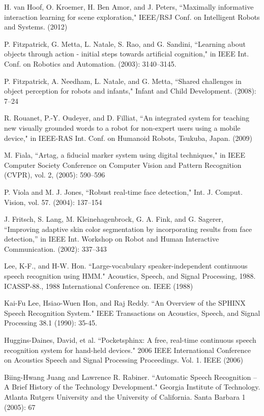\documentclass[conference]{IEEEtran}
\begin{document}
\begin{thebibliography}{1}
 H. van Hoof, O. Kroemer, H. Ben Amor, and J. Peters, ``Maximally informative interaction learning for scene exploration," IEEE/RSJ Conf. on Intelligent Robots and Systems. (2012)


 P. Fitzpatrick, G. Metta, L. Natale, S. Rao, and G. Sandini, ``Learning
about objects through action - initial steps towards artificial cognition," in IEEE Int. Conf. on Robotics and Automation. (2003): 3140–3145.

 P. Fitzpatrick, A. Needham, L. Natale, and G. Metta, ``Shared challenges
in object perception for robots and infants," Infant and Child Development. (2008): 7–24

 R. Rouanet, P.-Y. Oudeyer, and D. Filliat, ``An integrated system for
teaching new visually grounded words to a robot for non-expert users using a mobile device," in IEEE-RAS Int. Conf. on Humanoid Robots, Tsukuba, Japan. (2009)

 M. Fiala, ``Artag, a fiducial marker system using digital techniques," in
IEEE Computer Society Conference on Computer Vision and Pattern
Recognition (CVPR), vol. 2, (2005): 590–596


 P. Viola and M. J. Jones, ``Robust real-time face detection," Int. J.
Comput. Vision, vol. 57. (2004): 137–154

J. Fritsch, S. Lang, M. Kleinehagenbrock, G. A. Fink, and G. Sagerer,
“Improving adaptive skin color segmentation by incorporating results from face detection,” in IEEE Int. Workshop on Robot and Human Interactive Communication. (2002): 337–343

Lee, K-F., and H-W. Hon. ``Large-vocabulary speaker-independent continuous speech recognition using HMM." Acoustics, Speech, and Signal Processing, 1988. ICASSP-88., 1988 International Conference on. IEEE (1988)

Kai-Fu Lee, Hsiao-Wuen Hon, and Raj Reddy. ``An Overview of the {SPHINX} Speech Recognition System." IEEE Transactions on Acoustics, Speech, and Signal Processing 38.1 (1990): 35-45.

Huggins-Daines, David, et al. ``Pocketsphinx: A free, real-time continuous speech recognition system for hand-held devices." 2006 IEEE International Conference on Acoustics Speech and Signal Processing Proceedings. Vol. 1. IEEE (2006)

Biing-Hwang Juang and Lawrence R. Rabiner. ``Automatic Speech Recognition -- A Brief History of the Technology Development." Georgia Institute of Technology. Atlanta Rutgers University and the University of California. Santa Barbara 1 (2005): 67


\end{thebibliography}
\end{document}
